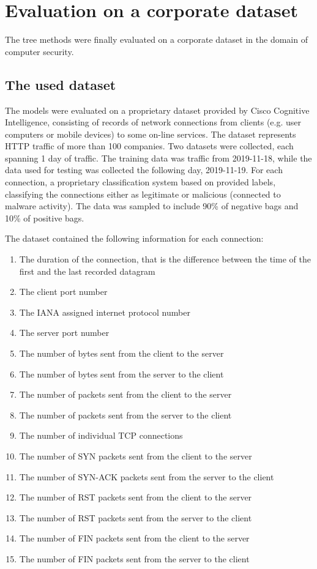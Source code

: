 \chapter{Evaluation on a corporate dataset}\label{chap:cisco-dataset}

The tree methods were finally evaluated on a corporate dataset in the domain of computer security.

\section{The used dataset}

The models were evaluated on a proprietary dataset provided by Cisco Cognitive Intelligence, consisting of records of network connections from clients (e.g. user computers or mobile devices) to some on-line services. The dataset represents HTTP traffic of more than 100 companies. Two datasets were collected, each spanning 1 day of traffic. The training data was traffic from 2019-11-18, while the data used for testing was collected the following day, 2019-11-19. For each connection, a proprietary classification system based on \cite{jusko_graph-based_2017} provided labels, classifying the connections either as legitimate or malicious (connected to malware activity). The data was sampled to include 90\% of negative bags and 10\% of positive bags.

The dataset contained the following information for each connection:
\begin{enumerate}
  \item The duration of the connection, that is the difference between the time of the first and the last recorded datagram
  \item The client port number
  \item The IANA assigned internet protocol number
  \item The server port number
  \item The number of bytes sent from the client to the server
  \item The number of bytes sent from the server to the client
  \item The number of packets sent from the client to the server
  \item The number of packets sent from the server to the client
  \item The number of individual TCP connections
  \item The number of SYN packets sent from the client to the server
  \item The number of SYN-ACK packets sent from the server to the client
  \item The number of RST packets sent from the client to the server
  \item The number of RST packets sent from the server to the client
  \item The number of FIN packets sent from the client to the server
  \item The number of FIN packets sent from the server to the client
\end{enumerate}

